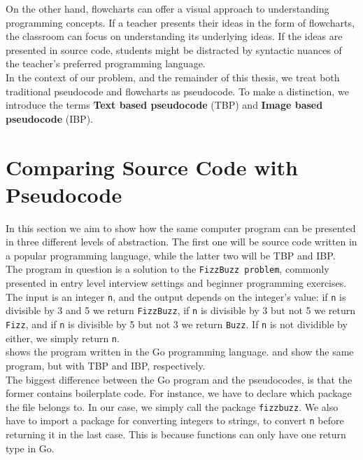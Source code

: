 On the other hand, flowcharts can offer a visual approach to understanding programming concepts. If a teacher presents their ideas in the form of flowcharts, the classroom can focus on understanding its underlying ideas. If the ideas are presented in source code, students might be distracted by syntactic nuances of the teacher's preferred programming language. \\

In the context of our problem, and the remainder of this thesis, we treat both traditional pseudocode and flowcharts as pseudocode. To make a distinction, we introduce the terms \textbf{Text based pseudocode} (TBP) and \textbf{Image based pseudocode} (IBP).

\section{Comparing Source Code with Pseudocode}

In this section we aim to show how the same computer program can be presented in three different levels of abstraction. The first one will be source code written in a popular programming language, while the latter two will be TBP and IBP. \\

The program in question is a solution to the \texttt{FizzBuzz problem}, commonly presented in entry level interview settings and beginner programming exercises. The input is an integer \texttt{n}, and the output depends on the integer's value: if \texttt{n} is divisible by 3 and 5 we return \texttt{FizzBuzz}, if \texttt{n} is divisible by 3 but not 5 we return \texttt{Fizz}, and if \texttt{n} is divisible by 5 but not 3 we return \texttt{Buzz}. If \texttt{n} is not dividible by either, we simply return \texttt{n}. \\

 shows the program written in the Go programming language.  and  show the same program, but with TBP and IBP, respectively. \\

The biggest difference between the Go program and the pseudocodes, is that the former contains boilerplate code. For instance, we have to declare which package the file belongs to. In our case, we simply call the package \texttt{fizzbuzz}. We also have to import a package for converting integers to strings, to convert \texttt{n} before returning it in the last case. This is because functions can only have one return type in Go. \\

